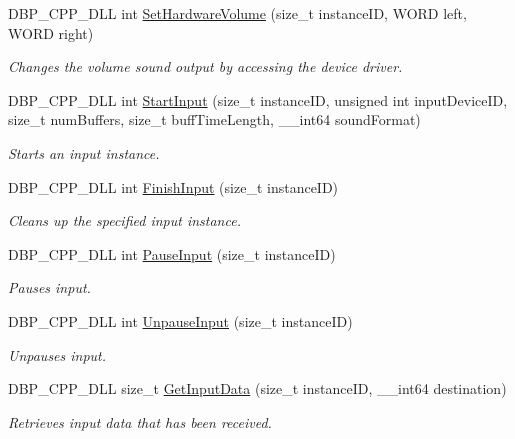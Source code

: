 \begin{DoxyCompactItemize}
DBP\_\-CPP\_\-DLL int \hyperlink{namespacemn_sound_a139b13922a75680cdf435d3c4fc1d15c}{SetHardwareVolume} (size\_\-t instanceID, WORD left, WORD right)
\begin{DoxyCompactList}\small\item\em Changes the volume sound output by accessing the device driver. \item\end{DoxyCompactList}\item 
DBP\_\-CPP\_\-DLL int \hyperlink{namespacemn_sound_a9e382bedc6fd0b60dee29b6740753fa5}{StartInput} (size\_\-t instanceID, unsigned int inputDeviceID, size\_\-t numBuffers, size\_\-t buffTimeLength, \_\-\_\-int64 soundFormat)
\begin{DoxyCompactList}\small\item\em Starts an input instance. \item\end{DoxyCompactList}\item 
DBP\_\-CPP\_\-DLL int \hyperlink{namespacemn_sound_a4e68d6163bfc0c74269169e2b8ffa9b4}{FinishInput} (size\_\-t instanceID)
\begin{DoxyCompactList}\small\item\em Cleans up the specified input instance. \item\end{DoxyCompactList}\item 
DBP\_\-CPP\_\-DLL int \hyperlink{namespacemn_sound_a7d2ecf983638b8ddfd46f37bd92065fc}{PauseInput} (size\_\-t instanceID)
\begin{DoxyCompactList}\small\item\em Pauses input. \item\end{DoxyCompactList}\item 
DBP\_\-CPP\_\-DLL int \hyperlink{namespacemn_sound_afc29d53b1d4120de1c7465f788524683}{UnpauseInput} (size\_\-t instanceID)
\begin{DoxyCompactList}\small\item\em Unpauses input. \item\end{DoxyCompactList}\item 
DBP\_\-CPP\_\-DLL size\_\-t \hyperlink{namespacemn_sound_a64a0d145d366a853a8e102fe190ee68a}{GetInputData} (size\_\-t instanceID, \_\-\_\-int64 destination)
\begin{DoxyCompactList}\small\item\em Retrieves input data that has been received. \item\end{DoxyCompactList}\item 

\end{DoxyCompactItemize}
